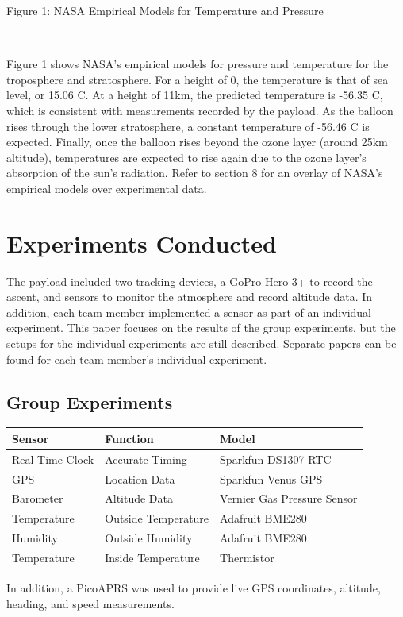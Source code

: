 \documentclass[12pt,]{article}
\begin{document}
Figure 1: NASA Empirical Models for Temperature and Pressure

~

Figure 1 shows NASA's empirical models for pressure and temperature for
the troposphere and stratosphere. For a height of 0, the temperature is
that of sea level, or 15.06 \degree C. At a height of 11km, the
predicted temperature is -56.35 \degree C, which is consistent with
measurements recorded by the payload. As the balloon rises through the
lower stratosphere, a constant temperature of -56.46 \degree C is
expected. Finally, once the balloon rises beyond the ozone layer (around
25km altitude), temperatures are expected to rise again due to the ozone
layer's absorption of the sun's radiation. Refer to section 8 for an
overlay of NASA's empirical models over experimental data.

\section{Experiments Conducted}\label{experiments-conducted}

The payload included two tracking devices, a GoPro Hero 3+ to record the
ascent, and sensors to monitor the atmosphere and record altitude data.
In addition, each team member implemented a sensor as part of an
individual experiment. This paper focuses on the results of the group
experiments, but the setups for the individual experiments are still
described. Separate papers can be found for each team member's
individual experiment.

\subsection{Group Experiments}\label{group-experiments}

\begin{longtable}[]{@{}lll@{}}
\toprule
Sensor & Function & Model\tabularnewline
\midrule
\endhead
Real Time Clock & Accurate Timing & Sparkfun DS1307 RTC\tabularnewline
GPS & Location Data & Sparkfun Venus GPS\tabularnewline
Barometer & Altitude Data & Vernier Gas Pressure Sensor\tabularnewline
Temperature & Outside Temperature & Adafruit BME280\tabularnewline
Humidity & Outside Humidity & Adafruit BME280\tabularnewline
Temperature & Inside Temperature & Thermistor\tabularnewline
\bottomrule
\end{longtable}

In addition, a PicoAPRS was used to provide live GPS coordinates,
altitude, heading, and speed measurements.
\end{document}
